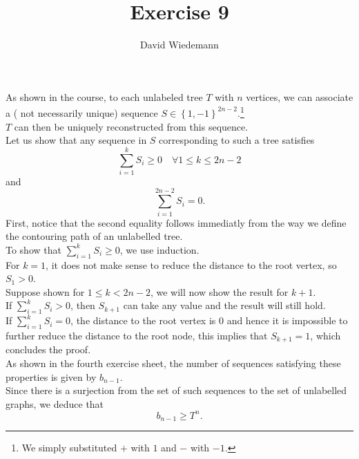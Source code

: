 \documentclass[11pt, a4paper]{article}
\begin{document}
\title{Exercise 9}
\author{David Wiedemann}
\maketitle
As shown in the course, to each unlabeled tree $T$ with $n$ vertices, we can associate a ( not necessarily unique)  sequence $S \in \left\{ 1,-1 \right\} ^{2n-2}$.\footnote { We simply substituted $+$ with $1$ and $-$ with $-1$.} \\
$T$ can then be uniquely reconstructed from this sequence.\\
Let us show that any sequence in $ S$ corresponding to such a tree satisfies 
\[ 
	\sum_{i=1}^{ k} S_i \geq 0 \quad \forall 1 \leq  k \leq 2n-2
\]
and 
\[ 
	\sum_{i=1}^{ 2n-2} S_i = 0 
.\]
\hr
First, notice that the second equality follows immediatly from the way we define the contouring path of an unlabelled tree.\\
\hr
To show that $\sum_{i=1}^{ k} S_i \geq 0 $, we use induction.\\
For $k=1$, it does not make sense to reduce the distance to the root vertex, so $S_1>0$.\\
Suppose shown for  $1 \leq k < 2n-2$, we will now show the result for $k+1$.\\
If $ \sum_{i=1}^{ k}S_i >0$, then $S_{k+1} $ can take any value and the result will still hold.\\
If $ \sum_{i=1}^{ k}S_i =0$, the distance to the root vertex is 0 and hence it is impossible to further reduce the distance to the root node, this implies that $S_{k+1} =1$, which concludes the proof.\\
\hr
As shown in the fourth exercise sheet, the number of sequences satisfying these properties is given by $b_{n-1} $.\\
Since there is a surjection from the set of such sequences to the set of unlabelled graphs, we deduce that
 \[ 
b_{n-1} \geq T^{n}.
\]
\end{document}
